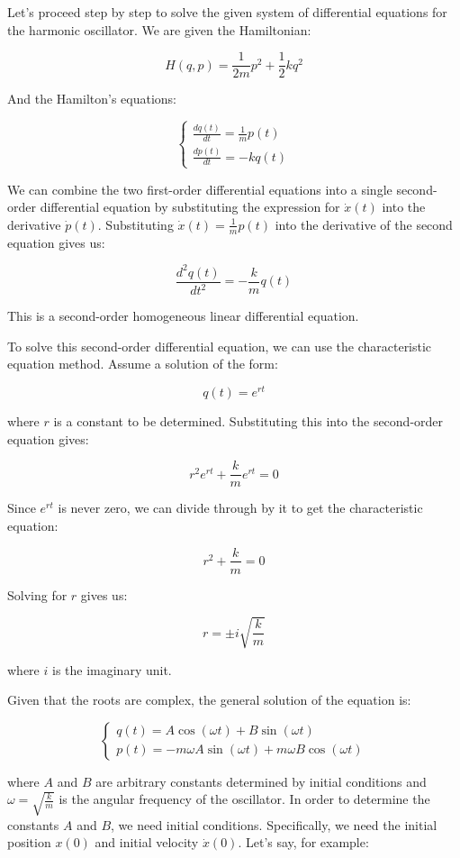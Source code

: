 \documentclass{article}
\begin{document}
Let's proceed step by step to solve the given system of differential equations for the harmonic oscillator. We are given the Hamiltonian:

\[
H(q,p) = \frac{1}{2m} p^2 + \frac{1}{2} k q^2
\]

And the Hamilton's equations:

\[
	\begin{cases}
		\frac{dq(t)}{dt} = \frac{1}{m} p(t) \\
		\frac{dp(t)}{dt} = -k q(t)
	\end{cases}
\]

We can combine the two first-order differential equations into a single second-order differential equation by substituting the expression for \( \dot{x}(t) \) into the derivative \( \dot{p}(t) \). Substituting \( \dot{x}(t) = \frac{1}{m} p(t) \) into the derivative of the second equation gives us:

\[
	\frac{d^2q(t)}{dt^2} = -\frac{k}{m} q(t)
\]

This is a second-order homogeneous linear differential equation.

To solve this second-order differential equation, we can use the characteristic equation method. Assume a solution of the form:

\[
	q(t) = e^{rt}
\]

where \( r \) is a constant to be determined. Substituting this into the second-order equation gives:

\[
	r^2 e^{rt} + \frac{k}{m} e^{rt} = 0
\]

Since \( e^{rt} \) is never zero, we can divide through by it to get the characteristic equation:

\[
	r^2 + \frac{k}{m} = 0
\]

Solving for \( r \) gives us:

\[
	r = \pm i \sqrt{\frac{k}{m}}
\]

where \( i \) is the imaginary unit.

Given that the roots are complex, the general solution of the equation is:

\[
	\begin{cases}
		q(t) = A \cos(\omega t) + B \sin(\omega t) \\
		p(t) = -m \omega A \sin(\omega t) + m \omega B \cos(\omega t)
	\end{cases}
\]

where \( A \) and \( B \) are arbitrary constants determined by initial conditions and \( \omega = \sqrt{\frac{k}{m}} \) is the angular frequency of the oscillator. In order to determine the constants \( A \) and \( B \), we need initial conditions. Specifically, we need the initial position \( x(0) \) and initial velocity \( \dot{x}(0) \). Let's say, for example:
\end{document}
